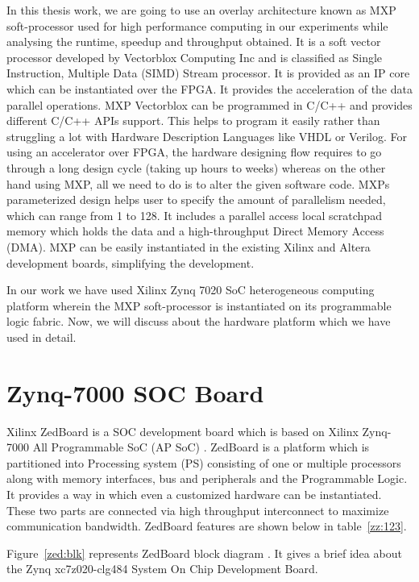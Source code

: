 In this thesis work, we are going to use an overlay architecture known as MXP soft-processor used for high performance computing in our experiments while analysing the runtime, speedup and throughput obtained. It is a soft vector processor developed by Vectorblox Computing Inc \cite{8} and is classified as Single Instruction, Multiple Data (SIMD) Stream processor. It is provided as an IP core which can be instantiated over the FPGA. It provides the acceleration of the data parallel operations. MXP Vectorblox can be programmed in C/C++ and provides different C/C++ APIs support. This helps to program it easily rather than struggling a lot with Hardware Description Languages like VHDL or Verilog. For using an accelerator over FPGA, the hardware designing flow requires to go through a long design cycle (taking up hours to weeks) whereas on the other hand using MXP, all we need to do is to alter the given software code. MXPs parameterized design helps user to specify the amount of parallelism needed, which can range from 1 to 128. It includes a parallel access local scratchpad memory which holds the data and a high-throughput Direct Memory Access (DMA). MXP can be easily instantiated in the existing Xilinx and Altera development boards, simplifying the development.

In our work we have used Xilinx Zynq 7020 SoC \cite{9} heterogeneous computing platform wherein the MXP soft-processor is instantiated on its programmable logic fabric. Now, we will discuss about the hardware platform which we have used in detail.


\section{Zynq-7000 SOC Board}

Xilinx ZedBoard is a SOC development board which is based on Xilinx Zynq-7000 All Programmable SoC (AP SoC) \cite{10}. ZedBoard is a platform which is partitioned into Processing system (PS) consisting of one or multiple processors along with memory interfaces, bus and peripherals and the Programmable Logic. It provides a way in which even a customized hardware can be instantiated. These two parts are connected via high throughput interconnect to maximize communication bandwidth. ZedBoard features are shown below in table~\ref{zz:123}.





Figure~\ref{zed:blk} represents ZedBoard block diagram \cite{11}. It gives a brief idea about the Zynq xc7z020-clg484 System On Chip Development Board.

